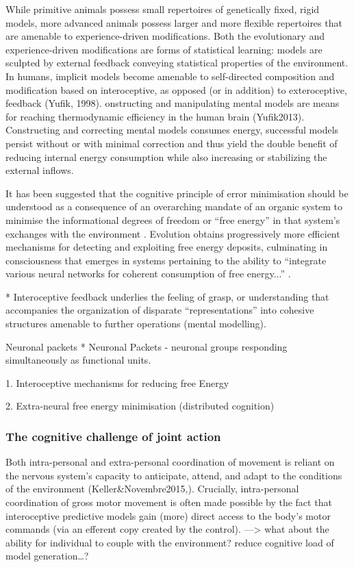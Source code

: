 \begin{CJK}{UTF8}{gbsn}
While primitive animals possess small repertoires of genetically fixed, rigid models, more advanced animals possess larger and more flexible repertoires that are amenable to experience-driven modifications. Both the evolutionary and experience-driven modifications are forms of statistical learning: models are sculpted by external feedback conveying statistical properties of the environment. In humans, implicit models become amenable to self-directed composition and modification based on interoceptive, as opposed (or in addition) to exteroceptive, feedback (Yufik, 1998).
onstructing and manipulating mental models are means for reaching thermodynamic efficiency in the human brain (Yufik2013).  Constructing and correcting mental models consumes energy, successful models persist without or with minimal correction and thus yield the double benefit of reducing internal energy consumption while also increasing or stabilizing the external inflows.

It has been suggested that the cognitive principle of error minimisation should be understood as a consequence of an overarching mandate of an organic system to minimise the informational degrees of freedom or ``free energy'' in that system's exchanges with the environment \citep{Friston2010}.  Evolution obtains progressively more efficient mechanisms for detecting and exploiting free energy deposits, culminating in consciousness that emerges in systems pertaining to the ability to ``integrate various neural networks for coherent consumption of free energy...'' \citep{Annila2017}.


* Interoceptive feedback underlies the feeling of grasp, or understanding that accompanies the organization of disparate “representations” into cohesive structures amenable to further operations (mental modelling).

Neuronal packets
* Neuronal Packets - neuronal groups responding simultaneously as functional units.



1. Interoceptive mechanisms for reducing free Energy

2. Extra-neural free energy minimisation (distributed cognition)



\subsubsection{The cognitive challenge of joint action}

Both intra-personal and extra-personal coordination of movement is reliant on the nervous system’s capacity to anticipate, attend, and adapt to the conditions of the environment (Keller&Novembre2015,).  Crucially, intra-personal coordination of gross motor movement is often made possible by the fact that interoceptive predictive models gain (more) direct access to the body's motor commands (via an efferent copy created by the control).
—> what about the ability for individual to couple with the environment? reduce cognitive load of model generation…?


\end{CJK}
